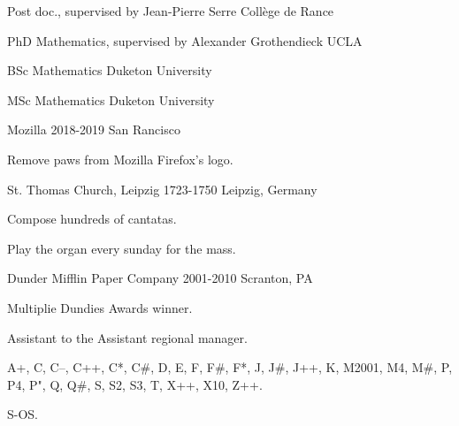 \documentclass{LoLaTeXcv}
\begin{document}
	


\begin{lltxDescription}
	\item[2024-2025] Post doc., supervised by Jean-Pierre Serre \lltxdotfill
		Collège de Rance
	\item[2020-2023] PhD Mathematics, supervised by Alexander Grothendieck \lltxdotfill UCLA
	\item[2019-2020] BSc Mathematics \lltxdotfill Duketon University
	\item[2015-2018] MSc Mathematics \lltxdotfill Duketon University
\end{lltxDescription}

\begin{lltxJob}[Designer]{
		Mozilla}{
		2018-2019}{
		San Rancisco}
	\item Remove paws from Mozilla Firefox's logo.
\end{lltxJob}

\begin{lltxJob}[Kapellmeister]{
		St. Thomas Church, Leipzig}{
		1723-1750}{
		Leipzig, Germany}
	\item Compose hundreds of cantatas.
	\item Play the organ every sunday for the mass.
\end{lltxJob}

\begin{lltxJob}{
	Dunder Mifflin Paper Company}{
		2001-2010}{
		Scranton, PA}
	\item Multiplie Dundies Awards winner.
	\item Assistant to the Assistant regional manager.
\end{lltxJob}


\begin{lltxDescription}
	\item[Programming] A+, C, C--, C++, C*, C$\#$, D, E, F, F$\#$, F*, J,
		J$\#$, J++, K, M2001, M4, M$\#$, P, P4, P", Q, Q$\#$, S, S2, S3, T,
		X++, X10, Z++.
	\item[Systems] S-OS.
\end{lltxDescription}
\newpage
\end{document}
